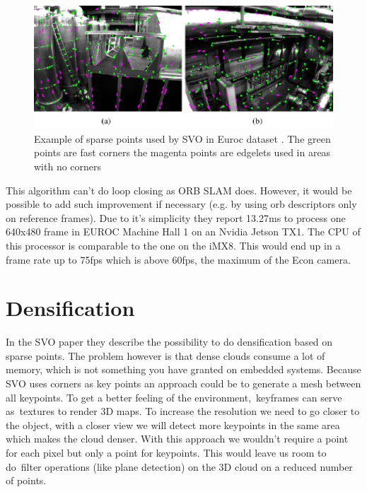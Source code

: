 \documentclass[11pt,a4paper,titlepage,oneside]{report}
\begin{document}
\begin{figure}[H]
  \begin{center}
		\includegraphics[width=1.0\textwidth]{img/svo.png}
  \end{center}
	\caption{Example of sparse points used by SVO in Euroc dataset \cite{svo}. The green points are fast corners the magenta points are edgelets used in areas with no corners}\label{fig:svo}
\end{figure}

This algorithm can't do loop closing as ORB SLAM does. However, it would be possible to add such improvement if necessary (e.g. by using orb descriptors only on reference frames). Due to it's simplicity they report 13.27ms to process one 640x480 frame in EUROC Machine Hall 1 on an Nvidia Jetson TX1. The CPU of this processor is comparable to the one on the iMX8. This would end up in a frame rate up to 75fps which is above 60fps, the maximum of the Econ camera.

\section{Densification}

In the SVO paper they describe the possibility to do densification based on sparse points. The problem however is that dense clouds consume a lot of memory, which is not something you have granted on embedded systems. Because SVO uses corners as key points an approach could be to generate a mesh between all keypoints. To get a better feeling of the environment, keyframes can serve as textures to render 3D maps. To increase the resolution we need to go closer to the object, with a closer view we will detect more keypoints in the same area which makes the cloud denser. With this approach we wouldn’t require a point for each pixel but only a point for keypoints. This would leave us room to do filter operations (like plane detection) on the 3D cloud on a reduced number of points.
\end{document}
